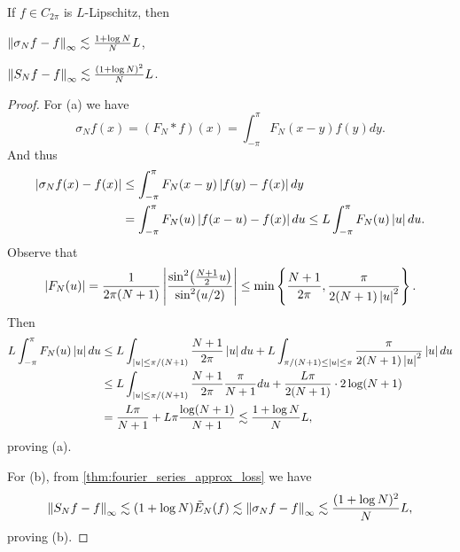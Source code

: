 \begin{theorem}
    If $f\in C_{2\pi}$ is $L$-Lipschitz, then
    \begin{thmenum}
        \item $\left\lVert {\sigma_Nf - f} \right\rVert_\infty \lesssim \frac{1+\log N}{N}L$,
        \item $\left\lVert {S_Nf - f} \right\rVert_\infty \lesssim \frac{(1+\log N)^2}{N}L$.
    \end{thmenum}
\end{theorem}
\begin{proof}
    For (a) we have 
    \begin{equation*}
        \sigma_Nf(x) = (F_N*f)(x) = \int_{-\pi}^\pi F_N(x-y)f(y)dy.
    \end{equation*}
    And thus
    \begin{equation*}
        \begin{split}
            \left\lvert {\sigma_Nf(x) - f(x)} \right\rvert &\leq \int_{-\pi}^\pi F_N(x-y)\left\lvert {f(y)-f(x)} \right\rvert dy \\
            &= \int_{-\pi}^\pi F_N(u)\left\lvert {f(x-u)-f(x)} \right\rvert du \leq L\int_{-\pi}^\pi F_N(u)\left\lvert {u} \right\rvert du.
        \end{split}
    \end{equation*}
    Observe that 
    \begin{equation*}
        \abs{F_N(u)} = \frac{1}{2\pi(N+1)}\abs{\frac{\sin^2\pth{\frac{N+1}{2}u}}{\sin^2(u/2)}} 
        \leq \min\set{\frac{N+1}{2\pi}, \frac{\pi}{2(N+1)\abs{u}^2}}.
    \end{equation*}
    Then 
    \begin{equation*}
        \begin{split}
            L\int_{-\pi}^\pi F_N(u)\left\lvert {u} \right\rvert du &\leq L\int_{\left\lvert {u} \right\rvert\leq \pi/(N+1)} \frac{N+1}{2\pi}\left\lvert {u} \right\rvert du + L\int_{\pi/(N+1)\leq\left\lvert {u} \right\rvert\leq\pi} \frac{\pi}{2(N+1)\left\lvert {u} \right\rvert^2}\left\lvert {u} \right\rvert du \\
            &\leq L\int_{\left\lvert {u} \right\rvert\leq \pi/(N+1)} \frac{N+1}{2\pi}\frac{\pi}{N+1}du + \frac{L\pi}{2(N+1)}\cdot 2\log(N+1) \\
            &= \frac{L\pi}{N+1} + L\pi\frac{\log(N+1)}{N+1} \lesssim \frac{1+\log N}{N}L,
        \end{split}
    \end{equation*}
    proving (a).
    
    For (b), from \cref{thm:fourier_series_approx_loss} we have
    \begin{equation*}
        \left\lVert {S_Nf - f} \right\rVert_\infty \lesssim (1+\log N)\tilde{E}_N(f) 
        \lesssim \left\lVert {\sigma_Nf - f} \right\rVert_\infty \lesssim \frac{(1+\log N)^2}{N}L,
    \end{equation*}
    proving (b).
\end{proof}

